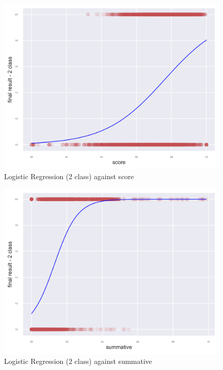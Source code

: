 \documentclass[11pt, a4paper]{article}
\begin{document}
\begin{multicols}{2}
\centering
\begin{figure}[H]
	\vspace{-0.4cm}
	\includegraphics[width=\linewidth]{LogisticRegression_2_class_model_against_score.png} 
	\caption{Logistic Regression (2 class) against score}
	\label{fig:LogScore}
\end{figure}

\centering
\begin{figure}[H]
	\vspace{-0.4cm}
	\includegraphics[width=\linewidth]{LogisticRegression_2_class_model_against_summative.png} 
	\caption{Logistic Regression (2 class) against summative}
	\label{fig:LogSumm}
\end{figure}


\end{multicols}
\end{document}
